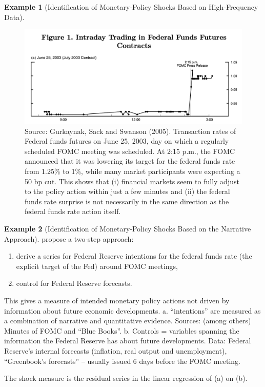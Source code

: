 \documentclass[
]{book}
\providecommand{\tightlist}{%
  \setlength{\itemsep}{0pt}\setlength{\parskip}{0pt}}
\theoremstyle{definition}
\theoremstyle{definition}
\newtheorem{example}{Example}[chapter]
\theoremstyle{definition}
\theoremstyle{definition}
\theoremstyle{remark}
\begin{document}
\begin{example}[Identification of Monetary-Policy Shocks Based on High-Frequency Data]
\begin{figure}
\includegraphics[width=0.95\linewidth]{images/GSS2005_HFI} \caption{Source: Gurkaynak, Sack and Swanson (2005). Transaction rates of Federal funds futures on June 25, 2003, day on which a regularly scheduled FOMC meeting was scheduled. At 2:15 p.m., the FOMC announced that it was lowering its target for the federal funds rate from 1.25\% to 1\%, while many market participants were expecting a 50 bp cut. This shows that (i) financial markets seem to fully adjust to the policy action within just a few minutes and (ii) the federal funds rate surprise is not necessarily in the same direction as the federal funds rate action itself.}\label{fig:HighFreq}
\end{figure}

\end{example}

\begin{example}[Identification of Monetary-Policy Shocks Based on the Narrative Approach]
\protect\hypertarget{exm:RomerRomer}{}\label{exm:RomerRomer}\citet{Romer_Romer_2004} propose a two-step approach:

\begin{enumerate}
\def\labelenumi{\alph{enumi}.}
\tightlist
\item
  derive a series for Federal Reserve intentions for the federal funds rate (the explicit target of the Fed) around FOMC meetings,
\item
  control for Federal Reserve forecasts.
\end{enumerate}

This gives a measure of intended monetary policy actions not driven by information about future economic developments.
a. ``intentions'' are measured as a combination of narrative and quantitative evidence. Sources: (among others) Minutes of FOMC and ``Blue Books''.
b. Controls = variables spanning the information the Federal Reserve has about future developments. Data: Federal Reserve's internal forecasts (inflation, real output and unemployment), ``Greenbook's forecasts'' -- usually issued 6 days before the FOMC meeting.

The shock measure is the residual series in the linear regression of (a) on (b).
\end{example}
\end{document}
